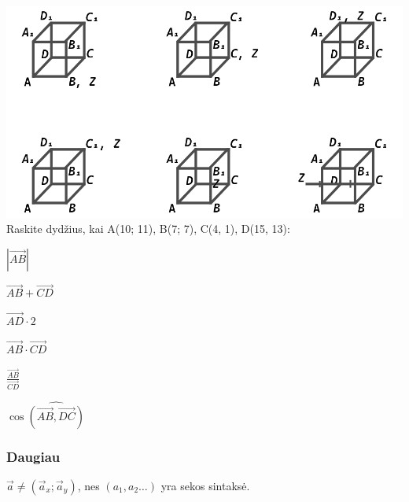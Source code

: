 \includegraphics[max width=\textwidth]{assets/vector_exercise.png}
Raskite dydžius, kai A(10; 11), B(7; 7), C(4, 1), D(15, 13): \\
\begin{exercises}
    \item $|\vec{AB}|                           $
    \item $\vec{AB} + \vec{CD}                  $
    \item $\vec{AD} \cdot 2                     $
    \item $\vec{AB} \cdot \vec{CD}              $
    \item $\frac{\vec{AB}}{\vec{CD}}            $
    \item $\cos \widehat{(\vec{AB}, \vec{DC})}  $
\end{exercises}

\subsubsection{Daugiau}

$\vec{a} \ne (\vec{a}_x; \vec{a}_y)$, nes $(a_1, a_2 \dots )$ yra sekos sintaksė.

\clearpage


